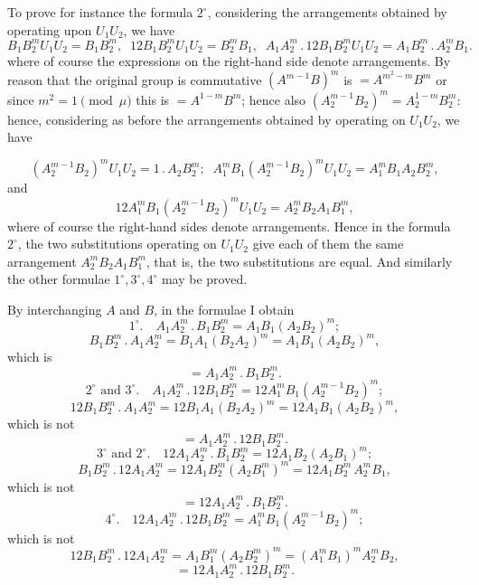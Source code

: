 \documentclass[11pt,a4paper]{article}
\begin{document}
To prove for instance the formula $2^{\circ}$, considering the arrangements obtained by operating upon $U_{1}U_{2}$, we have
\[
B_{1}B_{2}^{m}U_{1}U_{2} = B_{1}B_{2}^{m}, \;\; 12B_{1}B_{2}^{m}U_{1}U_{2} = B_{2}^{m}B_{1}, \;\; A_{1}A_{2}^{m}\,.\,12B_{1}B_{2}^{m}U_{1}U_{2} = A_{1}B_{2}^{m}\,.\,A_{2}^{m}B_{1}.
\]
where of course the expressions on the right-hand side denote arrangements. By reason that the original group is commutative $(A^{m-1}B)^{m}$ is $= A^{m^{2}-m}B^{m}$ or since $m^{2} = 1 \pmod{\mu}$ this is $= A^{1-m}B^{m}$; hence also $(A_{2}^{m-1}B_{2})^{m} = A_{2}^{1-m}B_{2}^{m}$: hence, considering as before the arrangements obtained by operating on $U_{1}U_{2}$, we have

\newpage


\[
(A_{2}^{m-1}B_{2})^{m}U_{1}U_{2} = 1\,.\,A_{2}B_{2}^{m}; \;\; A_{1}^{m}B_{1}(A_{2}^{m-1}B_{2})^{m}U_{1}U_{2} = A_{1}^{m}B_{1}A_{2}B_{2}^{m},
\]
and
\[
12A_{1}^{m}B_{1}(A_{2}^{m-1}B_{2})^{m}U_{1}U_{2} = A_{2}^{m}B_{2}A_{1}B_{1}^{m},
\]
where of course the right-hand sides denote arrangements. Hence in the formula $2^{\circ}$, the two substitutions operating on $U_{1}U_{2}$ give each of them the same arrangement $A_{2}^{m}B_{2}A_{1}B_{1}^{m}$, that is, the two substitutions are equal. And similarly the other formulae $1^{\circ}, 3^{\circ}, 4^{\circ}$ may be proved.

By interchanging $A$ and $B$, in the formulae I obtain
\[
1^{\circ}.\quad A_{1}A_{2}^{m}\,.\,B_{1}B_{2}^{m} = A_{1}B_{1}(A_{2}B_{2})^{m};
\]
\[
B_{1}B_{2}^{m}\,.\,A_{1}A_{2}^{m} = B_{1}A_{1}(B_{2}A_{2})^{m} = A_{1}B_{1}(A_{2}B_{2})^{m},
\]
which is
\[
= A_{1}A_{2}^{m}\,.\,B_{1}B_{2}^{m}.
\]
\[
2^{\circ}\text{ and } 3^{\circ}.\quad A_{1}A_{2}^{m}\,.\,12B_{1}B_{2}^{m} = 12A_{1}^{m}B_{1}(A_{2}^{m-1}B_{2})^{m};
\]
\[
12B_{1}B_{2}^{m}\,.\,A_{1}A_{2}^{m} = 12B_{1}A_{1}(B_{2}A_{2})^{m} = 12A_{1}B_{1}(A_{2}B_{2})^{m},
\]
which is not
\[
= A_{1}A_{2}^{m}\,.\,12B_{1}B_{2}^{m}.
\]
\[
3^{\circ}\text{ and } 2^{\circ}.\quad 12A_{1}A_{2}^{m}\,.\,B_{1}B_{2}^{m} = 12A_{1}B_{2}(A_{2}B_{1})^{m};
\]
\[
B_{1}B_{2}^{m}\,.\,12A_{1}A_{2}^{m} = 12A_{1}B_{2}^{m}(A_{2}B_{1}^{m})^{m} = 12A_{1}B_{2}^{m}\,A_{2}^{m}B_{1},
\]
which is not
\[
= 12A_{1}A_{2}^{m}\,.\,B_{1}B_{2}^{m}.
\]
\[
4^{\circ}.\quad 12A_{1}A_{2}^{m}\,.\,12B_{1}B_{2}^{m} = A_{1}^{m}B_{1}(A_{2}^{m-1}B_{2})^{m};
\]
which is not
\[
12B_{1}B_{2}^{m}\,.\,12A_{1}A_{2}^{m} = A_{1}B_{1}^{m}(A_{2}B_{2}^{m})^{m} = (A_{1}^{m}B_{1})^{m}A_{2}^{m}B_{2},
\]
\[
= 12A_{1}A_{2}^{m}\,.\,12B_{1}B_{2}^{m}.
\]
\end{document}
